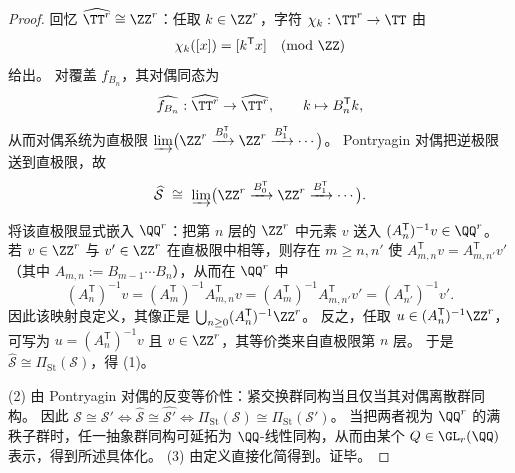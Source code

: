 \begin{proof}
回忆 \(\widehat{\TT^r}\cong\ZZ^r\)：任取 \(k\in\ZZ^r\)，字符 \(\chi_k:\TT^r\to\TT\) 由
\[
\chi_k([x])=[k^{\mathsf T}x]\quad(\mathrm{mod}\ \ZZ)
\]
给出。
对覆盖 \(f_{B_n}\)，其对偶同态为
\[
\widehat{f_{B_n}}:\widehat{\TT^r}\to\widehat{\TT^r},\qquad k\mapsto B_n^{\mathsf T}k,
\]
从而对偶系统为直极限
\(
\varinjlim\bigl(\ZZ^r\xrightarrow{B_0^{\mathsf T}}\ZZ^r\xrightarrow{B_1^{\mathsf T}}\cdots\bigr)
\)。
Pontryagin 对偶把逆极限送到直极限，故
\[
\widehat{\mathcal S}\ \cong\ \varinjlim\bigl(\ZZ^r\xrightarrow{B_0^{\mathsf T}}\ZZ^r\xrightarrow{B_1^{\mathsf T}}\cdots\bigr).
\]
\par
将该直极限显式嵌入 \(\QQ^r\)：把第 \(n\) 层的 \(\ZZ^r\) 中元素 \(v\) 送入 \((A_n^{\mathsf T})^{-1}v\in\QQ^r\)。
若 \(v\in\ZZ^r\) 与 \(v'\in\ZZ^r\) 在直极限中相等，则存在 \(m\ge n,n'\) 使
\(
A_{m,n}^{\mathsf T}v=A_{m,n'}^{\mathsf T}v'
\)
（其中 \(A_{m,n}:=B_{m-1}\cdots B_n\)），从而在 \(\QQ^r\) 中
\[
(A_n^{\mathsf T})^{-1}v
=(A_m^{\mathsf T})^{-1}A_{m,n}^{\mathsf T}v
=(A_m^{\mathsf T})^{-1}A_{m,n'}^{\mathsf T}v'
=(A_{n'}^{\mathsf T})^{-1}v'.
\]
因此该映射良定义，其像正是 \(\bigcup_{n\ge 0}(A_n^{\mathsf T})^{-1}\ZZ^r\)。
反之，任取 \(u\in(A_n^{\mathsf T})^{-1}\ZZ^r\)，可写为 \(u=(A_n^{\mathsf T})^{-1}v\) 且 \(v\in\ZZ^r\)，其等价类来自直极限第 \(n\) 层。
于是 \(\widehat{\mathcal S}\cong \Pi_{\mathrm{St}}(\mathcal S)\)，得 (1)。
\par
(2) 由 Pontryagin 对偶的反变等价性：紧交换群同构当且仅当其对偶离散群同构。
因此 \(\mathcal S\cong\mathcal S'\iff \widehat{\mathcal S}\cong\widehat{\mathcal S'}\iff \Pi_{\mathrm{St}}(\mathcal S)\cong \Pi_{\mathrm{St}}(\mathcal S')\)。
当把两者视为 \(\QQ^r\) 的满秩子群时，任一抽象群同构可延拓为 \(\QQ\)-线性同构，从而由某个 \(Q\in\GL_r(\QQ)\) 表示，得到所述具体化。
(3) 由定义直接化简得到。证毕。
\end{proof}





